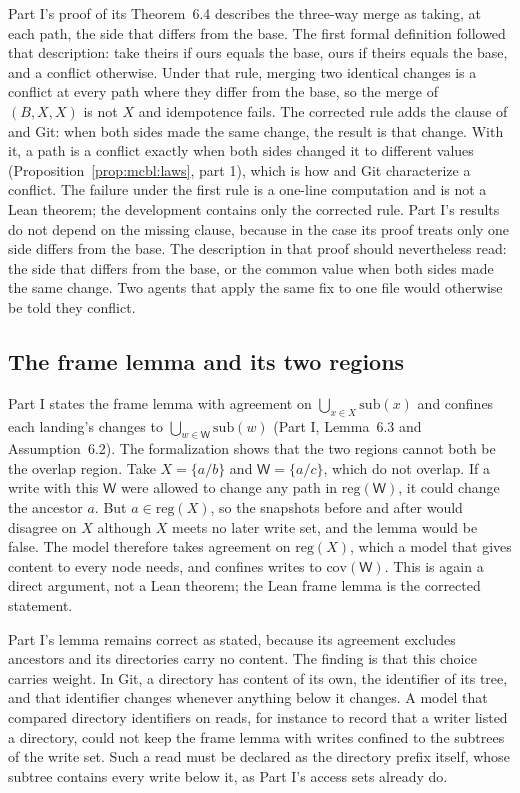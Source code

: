 \documentclass[11pt,letterpaper]{article}
\theoremstyle{definition}
\theoremstyle{remark}
\newcommand{\W}{\mathsf{W}}
\newcommand{\op}[1]{\mathrm{#1}}
\newcommand{\covd}{\op{cov}}
\newcommand{\reg}{\op{reg}}
\begin{document}
Part I's proof of its Theorem~6.4 describes the three-way merge as taking, at each path, the side that differs from the base. The first formal definition followed that description: take theirs if ours equals the base, ours if theirs equals the base, and a conflict otherwise. Under that rule, merging two identical changes is a conflict at every path where they differ from the base, so the merge of $(B,X,X)$ is not $X$ and idempotence fails. The corrected rule adds the clause of  and Git: when both sides made the same change, the result is that change. With it, a path is a conflict exactly when both sides changed it to different values (Proposition~\ref{prop:mcbl:laws}, part 1), which is how  and Git characterize a conflict. The failure under the first rule is a one-line computation and is not a Lean theorem; the development contains only the corrected rule. Part I's results do not depend on the missing clause, because in the case its proof treats only one side differs from the base. The description in that proof should nevertheless read: the side that differs from the base, or the common value when both sides made the same change. Two agents that apply the same fix to one file would otherwise be told they conflict.

\subsection{The frame lemma and its two regions}

Part I states the frame lemma with agreement on $\bigcup_{x\in X}\mathrm{sub}(x)$ and confines each landing's changes to $\bigcup_{w\in\W}\mathrm{sub}(w)$ (Part I, Lemma~6.3 and Assumption~6.2). The formalization shows that the two regions cannot both be the overlap region. Take $X=\{a/b\}$ and $\W=\{a/c\}$, which do not overlap. If a write with this $\W$ were allowed to change any path in $\reg(\W)$, it could change the ancestor $a$. But $a\in\reg(X)$, so the snapshots before and after would disagree on $X$ although $X$ meets no later write set, and the lemma would be false. The model therefore takes agreement on $\reg(X)$, which a model that gives content to every node needs, and confines writes to $\covd(\W)$. This is again a direct argument, not a Lean theorem; the Lean frame lemma is the corrected statement.

Part I's lemma remains correct as stated, because its agreement excludes ancestors and its directories carry no content. The finding is that this choice carries weight. In Git, a directory has content of its own, the identifier of its tree, and that identifier changes whenever anything below it changes. A model that compared directory identifiers on reads, for instance to record that a writer listed a directory, could not keep the frame lemma with writes confined to the subtrees of the write set. Such a read must be declared as the directory prefix itself, whose subtree contains every write below it, as Part I's access sets already do.
\end{document}
